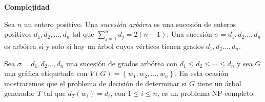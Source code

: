 \documentclass[12pt]{elsarticle}
\begin{document}
\begin{center}
 \textbf{Complejidad}
\end{center}

Sea $n$ un entero positivo. Una \textit {sucesión arbórea} es una sucesión de enteros positivos $d_1, d_2,\ldots,d_n$ tal que $\sum_{j=1}^{n} d_j = 2(n-1)$. Una sucesión $\sigma=d_1, d_2 \ldots, d_n$ es arbórea si y solo si hay un árbol cuyos vértices tienen grados  $d_1, d_2 \ldots, d_n$.

Sea $\sigma=d_1, d_2 \ldots, d_n$ una sucesión de grados arbórea con $d_1 \leq d_2 \leq \cdots \leq d_n$ y sea $G$ una gráfica etiquetada con $V(G)= \left\lbrace w_1, w_2, \ldots, w_n \right\rbrace $. En esta ocasión mostraremos que el problema de decisión de determinar si $G$ tiene un árbol generador $T$ tal que $d_T(w_i)=d_i$, con $1 \leq i \leq n $, es un problema NP-completo. 
\end{document}
